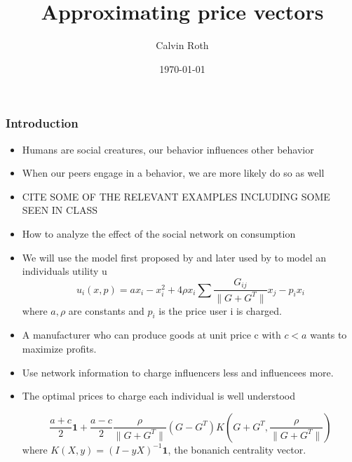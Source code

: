 \documentclass[a4paper,12pt]{beamer}
\title{Approximating price vectors}
\date{\today}
\author{Calvin Roth}
\begin{document}
\maketitle
\begin{frame}
  \frametitle{Introduction}
\end{frame}


\begin{frame}
  \begin{itemize}
    \item Humans are social creatures, our behavior influences other behavior
    \item When our peers engage in a behavior, we are more likely do so as well
          \item CITE SOME OF THE RELEVANT EXAMPLES INCLUDING SOME SEEN IN CLASS
  \end{itemize}
\end{frame}

\begin{frame}
  \begin{itemize}
    \item How to analyze the effect of the social network on consumption \\
    \item We will use the model first proposed by \cite{candogan2012optimal} and later used by \cite{huang2021value} to model an individuals utility u
          \begin{equation}
            u_{i}(x, p) = ax_{i} - x_{i}^{2} + 4 \rho x_{i} \sum \frac{G_{ij}}{\|G+G^{T}\|} x_{j} - p_{i}x_{i}
          \end{equation}
          where $a,\rho$ are constants and $p_{i}$ is the price user i is charged.
\end{itemize}
\end{frame}


\begin{frame}
  \begin{itemize}
    \item A manufacturer who can produce goods at unit price c with $c < a$ wants to maximize profits.
    \item Use network information to charge influencers less and influencees more.
    \item The optimal prices to charge each individual is well understood\cite{candogan2012optimal}\cite{huang2021value}

          \begin{equation}
            \frac{a+c}{2} \textbf{1} + \frac{a-c}{2} \frac{\rho}{\| G + G^{T}\|} (G - G^{T}) K(G+G^{T}, \frac{\rho}{\|G+G^{T}\|})
          \end{equation}
          where $K(X, y) = (I - yX)^{-1}\textbf{1}$, the bonanich centrality vector.
   \end{itemize}
\end{frame}
\end{document}
